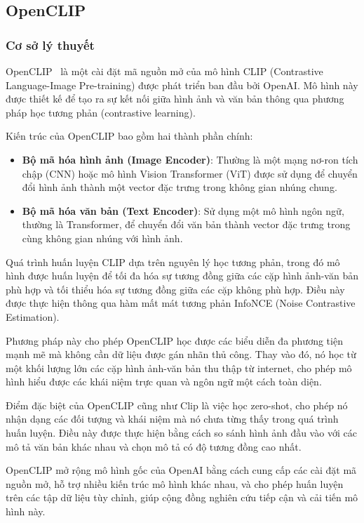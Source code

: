 \subsection{OpenCLIP}
\label{sec:open_clip}

\subsubsection{Cơ sở lý thuyết}

OpenCLIP~\cite{openclip} là một cài đặt mã nguồn mở của mô hình CLIP (Contrastive Language-Image Pre-training) được phát triển ban đầu bởi OpenAI. Mô hình này được thiết kế để tạo ra sự kết nối giữa hình ảnh và văn bản thông qua phương pháp học tương phản (contrastive learning).

Kiến trúc của OpenCLIP bao gồm hai thành phần chính:
\begin{itemize}
    \item \textbf{Bộ mã hóa hình ảnh (Image Encoder)}: Thường là một mạng nơ-ron tích chập (CNN) hoặc mô hình Vision Transformer (ViT) được sử dụng để chuyển đổi hình ảnh thành một vector đặc trưng trong không gian nhúng chung.
    
    \item \textbf{Bộ mã hóa văn bản (Text Encoder)}: Sử dụng một mô hình ngôn ngữ, thường là Transformer, để chuyển đổi văn bản thành vector đặc trưng trong cùng không gian nhúng với hình ảnh.
\end{itemize}

Quá trình huấn luyện CLIP dựa trên nguyên lý học tương phản, trong đó mô hình được huấn luyện để tối đa hóa sự tương đồng giữa các cặp hình ảnh-văn bản phù hợp và tối thiểu hóa sự tương đồng giữa các cặp không phù hợp. Điều này được thực hiện thông qua hàm mất mát tương phản InfoNCE (Noise Contrastive Estimation).

Phương pháp này cho phép OpenCLIP học được các biểu diễn đa phương tiện mạnh mẽ mà không cần dữ liệu được gán nhãn thủ công. Thay vào đó, nó học từ một khối lượng lớn các cặp hình ảnh-văn bản thu thập từ internet, cho phép mô hình hiểu được các khái niệm trực quan và ngôn ngữ một cách toàn diện.

Điểm đặc biệt của OpenCLIP cũng như Clip là việc học zero-shot, cho phép nó nhận dạng các đối tượng và khái niệm mà nó chưa từng thấy trong quá trình huấn luyện. Điều này được thực hiện bằng cách so sánh hình ảnh đầu vào với các mô tả văn bản khác nhau và chọn mô tả có độ tương đồng cao nhất.

OpenCLIP mở rộng mô hình gốc của OpenAI bằng cách cung cấp các cài đặt mã nguồn mở, hỗ trợ nhiều kiến trúc mô hình khác nhau, và cho phép huấn luyện trên các tập dữ liệu tùy chỉnh, giúp cộng đồng nghiên cứu tiếp cận và cải tiến mô hình này.


